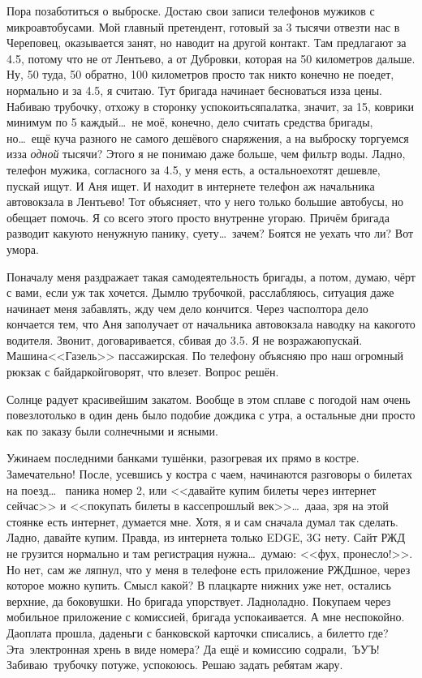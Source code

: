 Пора позаботиться о выброске. Достаю свои записи телефонов мужиков с микроавтобусами. Мой главный претендент, готовый за 3 тысячи отвезти нас в Череповец, оказывается занят, но наводит на другой контакт. Там предлагают за 4.5, потому что не от Лентьево, а от Дубровки, которая на 50 километров дальше. Ну, 50 туда, 50 обратно, 100 километров просто так никто конечно не поедет, нормально и за 4.5, я считаю. Тут бригада начинает бесноваться из\sdash за цены. Набиваю трубочку, отхожу в сторонку успокоиться\mdash палатка, значит, за 15, коврики минимум по 5 каждый\ldots~не моё, конечно, дело считать средства бригады, но\ldots~ещё куча разного не самого дешёвого снаряжения, а на выброску торгуемся из\sdash за \textit{одной} тысячи? Этого я не понимаю даже больше, чем фильтр воды. Ладно, телефон  мужика, согласного за 4.5, у  меня есть, а остальное\mdash хотят дешевле, пускай ищут. И Аня ищет. И находит в интернете телефон аж начальника автовокзала в Лентьево! Тот объясняет, что у него только большие автобусы, но обещает помочь. Я со всего этого просто внутренне угораю. Причём бригада разводит какую\sdash то ненужную панику, суету\ldots~зачем? Боятся не уехать что ли? Вот умора.

Поначалу меня раздражает такая самодеятельность бригады, а потом, думаю, чёрт с вами, если уж так хочется. Дымлю трубочкой, расслабляюсь, ситуация даже начинает меня забавлять, жду чем дело кончится. Через час\sdash полтора дело кончается тем, что Аня заполучает от начальника автовокзала наводку на какого\sdash то водителя. Звонит, договаривается, сбивая до 3.5. Я не возражаю\mdash пускай. Машина\mdash <<Газель>> пассажирская. По телефону объясняю про наш огромный рюкзак с байдаркой\mdash говорят, что влезет. Вопрос решён.

Солнце радует красивейшим закатом. Вообще в этом сплаве с погодой нам очень повезло\mdash только в один день было подобие дождика с утра, а остальные дни просто как по заказу были солнечными и ясными.

Ужинаем последними банками тушёнки, разогревая их прямо в костре. Замечательно! После, усевшись у костра с чаем, начинаются разговоры о билетах на поезд\ldots~ паника номер 2, или <<давайте купим билеты через интернет сейчас>> и <<покупать билеты в кассе\mdash прошлый век>>\ldots~да\sdash а\sdash а, зря на этой стоянке есть интернет, думается мне. Хотя, я и сам сначала думал так сделать. Ладно, давайте купим. Правда, из интернета только EDGE, 3G нету. Сайт РЖД не грузится нормально и там регистрация нужна\ldots~думаю: <<фух, пронесло!>>. Но нет, сам же ляпнул, что у меня в телефоне есть приложение РЖД\sdash шное, через которое можно купить. Смысл какой? В плацкарте нижних уже нет, остались верхние, да боковушки. Но бригада упорствует. Ладно\sdash ладно. Покупаем через мобильное приложение с комиссией, бригада успокаивается. А мне неспокойно. Да\mdash оплата прошла, да\mdash деньги с банковской карточки списались, а билет\sdash то где? Эта~электронная хрень в виде номера? Да ещё и комиссию содрали,~ЪУЪ! Забиваю~трубочку потуже, успокоюсь. Решаю задать ребятам жару.

